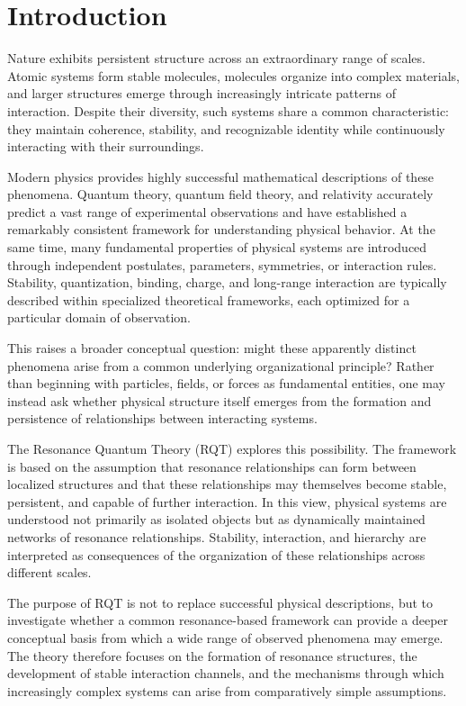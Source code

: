 \documentclass[11pt,a4paper]{article}
\begin{document}

\section{Introduction}

Nature exhibits persistent structure across an extraordinary range of scales. Atomic systems form stable molecules, molecules organize into complex materials, and larger structures emerge through increasingly intricate patterns of interaction. Despite their diversity, such systems share a common characteristic: they maintain coherence, stability, and recognizable identity while continuously interacting with their surroundings.

Modern physics provides highly successful mathematical descriptions of these phenomena. Quantum theory, quantum field theory, and relativity accurately predict a vast range of experimental observations and have established a remarkably consistent framework for understanding physical behavior. At the same time, many fundamental properties of physical systems are introduced through independent postulates, parameters, symmetries, or interaction rules. Stability, quantization, binding, charge, and long-range interaction are typically described within specialized theoretical frameworks, each optimized for a particular domain of observation.

This raises a broader conceptual question: might these apparently distinct phenomena arise from a common underlying organizational principle? Rather than beginning with particles, fields, or forces as fundamental entities, one may instead ask whether physical structure itself emerges from the formation and persistence of relationships between interacting systems.

The Resonance Quantum Theory (RQT) explores this possibility. The framework is based on the assumption that resonance relationships can form between localized structures and that these relationships may themselves become stable, persistent, and capable of further interaction. In this view, physical systems are understood not primarily as isolated objects but as dynamically maintained networks of resonance relationships. Stability, interaction, and hierarchy are interpreted as consequences of the organization of these relationships across different scales.

The purpose of RQT is not to replace successful physical descriptions, but to investigate whether a common resonance-based framework can provide a deeper conceptual basis from which a wide range of observed phenomena may emerge. The theory therefore focuses on the formation of resonance structures, the development of stable interaction channels, and the mechanisms through which increasingly complex systems can arise from comparatively simple assumptions.
\end{document}
